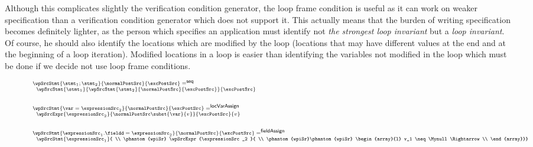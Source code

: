 Although this complicates slightly the verification condition generator, the loop frame condition is useful as it can work 
on weaker specification than a verification condition generator which does not support it. This actually means that the burden of writing specification 
becomes definitely lighter, as the person which specifies an application must identify not  \textit{the strongest loop invariant }
but a \textit{loop invariant}. Of course, he should also identify  the locations which are modified by the loop (locations that may have different values 
at the end and at the beginning of a loop iteration). Modified locations in a loop is easier than identifying the variables not modified in the loop which 
must be done if we decide not use loop frame conditions. 

\begin{figure}[ht!]
\begin{frameit}
$${\scriptsize 
        \begin{array}{l} 
	   \wpSrcStmt{ \stmt_1;\stmt_2}{\normalPostSrc }{ \excPostSrc } =^{\mbox{\rm\textsf{seq}}} \\
	   \begin{array}{l} 
             \wpSrcStmt{\stmt_1 }{\wpSrcStmt{\stmt_2 }{\normalPostSrc }{ \excPostSrc}} { \excPostSrc} 
           \end{array} \\ \\ \\
    \wpSrcStmt{ \var = \expressionSrc_2}{\normalPostSrc }{ \excPostSrc } =^{\mbox{\rm\textsf{locVarAssign}}} \\
                  \begin{array}{l}   \wpSrcExpr{\expressionSrc_2 }{ 
				    \normalPostSrc \subst{\var}{v}   
				   }{ \excPostSrc}{v}  
		  \end{array} \\ \\ \\
    \wpSrcStmt{ \expressionSrc_1.\fieldd = \expressionSrc_2}{\normalPostSrc }{ \excPostSrc } = ^{\mbox{\rm\textsf{fieldAssign}}}\\
               \begin{array}{l} 
	       \wpSrcStmt{\expressionSrc_1}{  \\
	        \phantom{wpiSr} \wpSrcExpr{\expressionSrc_2 }{ \\
		\phantom{wpiSr}\phantom{wpiSr}
		\begin{array}{l}
		    v_1 \neq \Mynull  \Rightarrow \\

\end{array}}}
\end{array}
\end{array}}$$
\end{frameit}
\end{figure}
